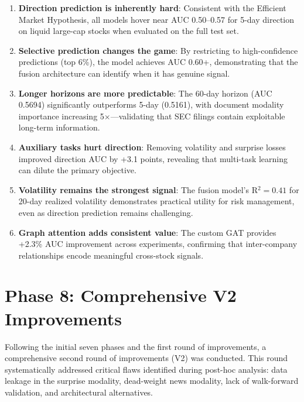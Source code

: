 \documentclass[12pt,a4paper]{article}
\begin{document}
\begin{enumerate}
    \item \textbf{Direction prediction is inherently hard}: Consistent with the Efficient Market Hypothesis, all models hover near AUC 0.50--0.57 for 5-day direction on liquid large-cap stocks when evaluated on the full test set.
    
    \item \textbf{Selective prediction changes the game}: By restricting to high-confidence predictions (top 6\%), the model achieves AUC 0.60+, demonstrating that the fusion architecture can identify when it has genuine signal.
    
    \item \textbf{Longer horizons are more predictable}: The 60-day horizon (AUC 0.5694) significantly outperforms 5-day (0.5161), with document modality importance increasing 5$\times$---validating that SEC filings contain exploitable long-term information.
    
    \item \textbf{Auxiliary tasks hurt direction}: Removing volatility and surprise losses improved direction AUC by +3.1 points, revealing that multi-task learning can dilute the primary objective.
    
    \item \textbf{Volatility remains the strongest signal}: The fusion model's R$^2 = 0.41$ for 20-day realized volatility demonstrates practical utility for risk management, even as direction prediction remains challenging.
    
    \item \textbf{Graph attention adds consistent value}: The custom GAT provides +2.3\% AUC improvement across experiments, confirming that inter-company relationships encode meaningful cross-stock signals.
\end{enumerate}

\newpage
\section{Phase 8: Comprehensive V2 Improvements}
\label{sec:v2improvements}

Following the initial seven phases and the first round of improvements, a comprehensive second round of improvements (V2) was conducted. This round systematically addressed critical flaws identified during post-hoc analysis: data leakage in the surprise modality, dead-weight news modality, lack of walk-forward validation, and architectural alternatives.
\end{document}
